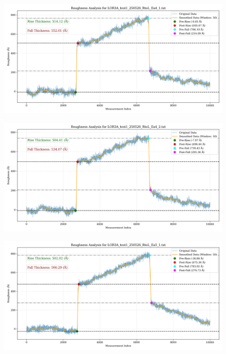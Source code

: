 \documentclass[platex,dvipdfmx,10pt,twoside,a4paper,jis2004]{jsarticle}
\begin{document}
\begin{figure}[H]
    \centering
    \includegraphics[width=\textwidth]{LOR3A_test1_250526_RtoL_Ea4_1.png}
    \label{fig:LOR3Atest1250526RtoLEa41}
\end{figure}
\begin{figure}[H]
    \centering
    \includegraphics[width=\textwidth]{LOR3A_test1_250526_RtoL_Ea4_2.png}
    \label{fig:LOR3Atest1250526RtoLEa42}
\end{figure}
\begin{figure}[H]
    \centering
    \includegraphics[width=\textwidth]{LOR3A_test1_250526_RtoL_Ea5_1.png}
    \label{fig:LOR3Atest1250526RtoLEa51}
\end{figure}
\end{document}
